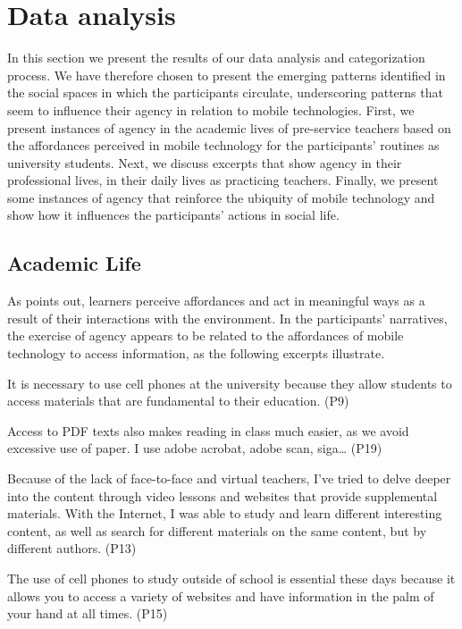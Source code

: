 \section{Data analysis}\label{sec-dataanalysis}

In this section we present the results of our data analysis and categorization process. We have therefore chosen to present the emerging patterns identified in the social spaces in which the participants circulate, underscoring patterns that seem to influence their agency in relation to mobile technologies. First, we present instances of agency in the academic lives of pre-service teachers based on the affordances perceived in mobile technology for the participants' routines as university students. Next, we discuss excerpts that show agency in their professional lives, in their daily lives as practicing teachers. Finally, we present some instances of agency that reinforce the ubiquity of mobile technology and show how it influences the participants' actions in social life.

\subsection{Academic Life}\label{subsec-academiclife}

As \textcite{mercer2012} points out, learners perceive affordances and act in meaningful ways as a result of their interactions with the environment. In the participants' narratives, the exercise of agency appears to be related to the affordances of mobile technology to access information, as the following excerpts illustrate.

It is necessary to use cell phones at the university because they allow students to access materials that are fundamental to their education. (P9)

Access to PDF texts also makes reading in class much easier, as we avoid excessive use of paper. I use adobe acrobat, adobe scan, siga… (P19)

Because of the lack of face-to-face and virtual teachers, I've tried to delve deeper into the content through video lessons and websites that provide supplemental materials. With the Internet, I was able to study and learn different interesting content, as well as search for different materials on the same content, but by different authors. (P13)

The use of cell phones to study outside of school is essential these days because it allows you to access a variety of websites and have information in the palm of your hand at all times. (P15)

